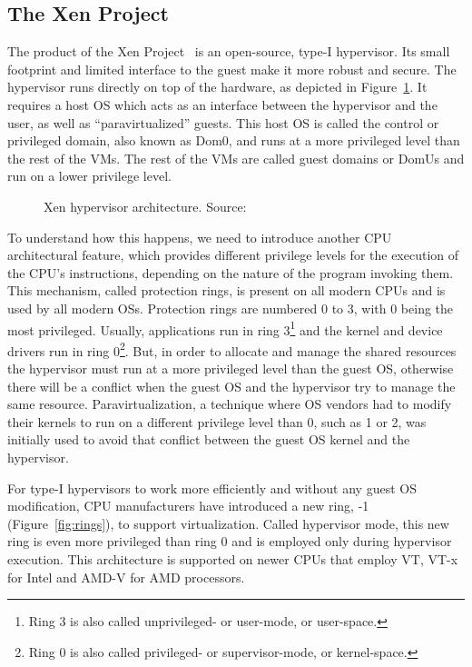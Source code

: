 \subsection{The Xen Project}\label{sub:xen}
The product of the Xen Project~\cite{xen} is an open-source, type-I hypervisor. Its small footprint and limited interface to the guest make it more robust and secure. The hypervisor runs directly on top of the hardware, as depicted in Figure~\ref{img:xen}. It requires a host \ac{OS} which acts as an interface between the hypervisor and the user, as well as ``paravirtualized'' guests. This host \ac{OS} is called the control or privileged domain, also known as Dom0, and runs at a more privileged level than the rest of the \ac{VM}s. The rest of the \acp{VM} are called guest domains or DomUs and run on a lower privilege level. 

\begin{figure}
	\centering
	
	\caption{Xen hypervisor architecture. Source:~\cite{xen}}
	\label{img:xen}
\end{figure}

\par To understand how this happens, we need to introduce another \ac{CPU} architectural feature, which provides different privilege levels for the execution of the \ac{CPU}'s instructions, depending on the nature of the program invoking them. This mechanism, called protection rings, is present on all modern \ac{CPU}s and is used by all modern \acp{OS}. Protection rings are numbered 0 to 3, with 0 being the most privileged. Usually, applications run in ring 3\footnote{Ring 3 is also called unprivileged- or user-mode, or user-space.} and the kernel and device drivers run in ring 0\footnote{Ring 0 is also called privileged- or supervisor-mode, or kernel-space.}. But, in order to allocate and manage the shared resources the hypervisor must run at a more privileged level than the guest \ac{OS}, otherwise there will be a conflict when the guest \ac{OS} and the hypervisor try to manage the same resource. Paravirtualization, a technique where \ac{OS} vendors had to modify their kernels to run on a different privilege level than 0, such as 1 or 2, was initially used to avoid that conflict between the guest \ac{OS} kernel and the hypervisor.

\par For type-I hypervisors to work more efficiently and without any guest \ac{OS} modification, \ac{CPU} manufacturers have introduced a new ring, -1 (Figure~\ref{fig:rings}), to support virtualization. Called hypervisor mode, this new ring is even more privileged than ring 0 and is employed only during hypervisor execution. This architecture is supported on newer \ac{CPU}s that employ \ac{VT}, VT-x for Intel and AMD-V for AMD processors. 

